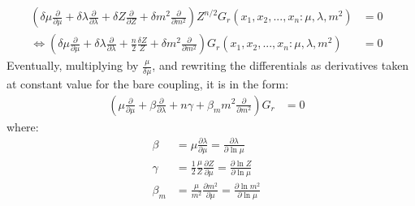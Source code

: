\documentclass[fleqn]{article}
\begin{document}
\begin{align}
(\delta \mu \frac{\partial}{\partial \mu} + \delta \lambda \frac{\partial}{\partial \lambda }+ \delta Z \frac{\partial}{\partial Z} + \delta m^{2} \frac{\partial}{\partial m^{2}})Z^{n/2} \textit{G}_r(x_1,x_2,...,x_n:\mu, \lambda, m^{2} ) & = 0 &\nonumber \\
\Leftrightarrow (\delta \mu \frac{\partial}{\partial \mu} + \delta \lambda \frac{\partial}{\partial \lambda }+\frac{n}{2}\frac{\delta Z}{Z} + \delta m^{2} \frac{\partial}{\partial m^{2}})\textit{G}_r(x_1,x_2,...,x_n:\mu, \lambda, m^{2} ) & = 0 & 
\end{align}
Eventually, multiplying by $\frac{\mu}{\delta \mu}$, and rewriting the differentials as derivatives taken at constant value for the bare coupling, it is in the form:
\begin{align}
(\mu \frac{\partial}{\partial \mu} + \beta \frac{\partial}{\partial \lambda} + n\gamma + \beta_m m^{2} \frac{\partial}{\partial m^{2}}) \textit{G}_r &=0&
\end{align}
where:
\begin{align}
\beta &= \mu \frac{\partial \lambda}{\partial \mu}
 = \frac{\partial \lambda}{\partial \ln \mu}& \\
 \gamma & = \frac{1}{2}\frac{\mu}{Z} \frac{\partial Z}{\partial \mu} = \frac{\partial \ln Z}{\partial \ln \mu}& \\
 \beta_m &= \frac{\mu}{m^{2}}\frac{\partial m^{2}}{\partial \mu} = \frac{\partial \ln m^{2}}{\partial \ln \mu}&
\end{align}
\end{document}
